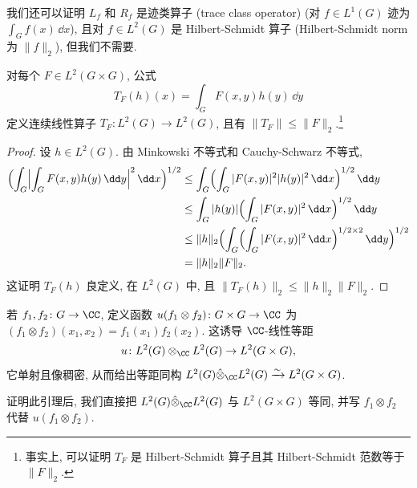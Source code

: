 \begin{remark}
\label{rem:IV.8.3}
我们还可以证明 $L_f$ 和 $R_f$ 是迹类算子 (trace class operator) (对 $f \in L^1(G)$ 迹为 $\int_G f(x)\,\dd x$), 且对 $f \in L^2(G)$ 是 Hilbert-Schmidt 算子 (Hilbert-Schmidt norm 为 $\|f\|_2$), 但我们不需要.
\end{remark}

\begin{lemma}[核算子]
\label{lem:IV.8.4}
对每个 $F \in L^2(G \times G)$, 公式
\[
T_F(h)(x) = \int_G F(x, y)h(y)\,\dd y
\]
定义连续线性算子 $T_F \colon L^2(G) \to L^2(G)$, 且有 $\|T_F\| \leq \|F\|_2$.\footnote{事实上, 可以证明 $T_F$ 是 Hilbert-Schmidt 算子且其 Hilbert-Schmidt 范数等于 $\|F\|_2$.}
\end{lemma}

\begin{proof}
设 $h \in L^2(G)$. 由 Minkowski 不等式和 Cauchy-Schwarz 不等式,
\begin{align*}
\Bigl(\int_G\Bigl|\int_G F(x, y)h(y)\,\dd y\Bigr|^2\,\dd x\Bigr)^{1/2} &\leq \int_G\Bigl(\int_G|F(x, y)|^2|h(y)|^2\,\dd x\Bigr)^{1/2}\,\dd y \\
&\leq \int_G |h(y)|\Bigl(\int_G|F(x, y)|^2\,\dd x\Bigr)^{1/2}\,\dd y \\
&\leq \|h\|_2\Bigl(\int_G\Bigl(\int_G|F(x, y)|^2\,\dd x\Bigr)^{1/2 \times 2}\,\dd y\Bigr)^{1/2} \\
&= \|h\|_2\|F\|_2.
\end{align*}
这证明 $T_F(h)$ 良定义, 在 $L^2(G)$ 中, 且 $\|T_F(h)\|_2 \leq \|h\|_2\|F\|_2$.
\end{proof}

\begin{lemma}
\label{lem:IV.8.5}
若 $f_1, f_2 \colon G \to \CC$, 定义函数 $u(f_1 \otimes f_2) \colon G \times G \to \CC$ 为 $(f_1 \otimes f_2)(x_1, x_2) = f_1(x_1)f_2(x_2)$. 这诱导 $\CC$-线性等距
\[
u \colon L^2(G) \otimes_{\CC}L^2(G) \to L^2(G \times G),
\]
它单射且像稠密, 从而给出等距同构 $L^2(G)\hat{\otimes}_{\CC}L^2(G) \xrightarrow{\sim} L^2(G \times G)$.
\end{lemma}

证明此引理后, 我们直接把 $L^2(G)\hat{\otimes}_{\CC}L^2(G)$ 与 $L^2(G \times G)$ 等同, 并写 $f_1 \otimes f_2$ 代替 $u(f_1 \otimes f_2)$.

